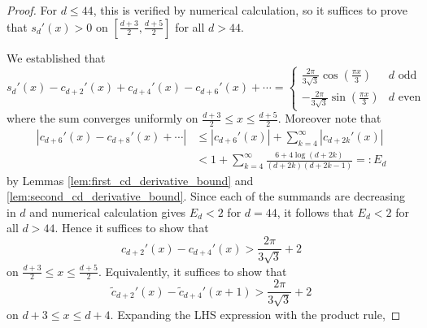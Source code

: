 \documentclass[10pt,a4paper]{amsart}
\begin{document}
 \begin{proof}
    For $d\leq 44$, this is verified by numerical calculation, so it suffices to prove that $s_d'(x) > 0 $ on $[\frac{d+3}{2},\frac{d+5}{2}]$ for all $d> 44$. 
    
    We established that
    $$ s_d'(x) - c_{d+2}'(x) + c_{d+4}'(x) - c_{d+6}'(x) + \cdots =  \begin{cases}
        \frac{2\pi}{3\sqrt{3}}\cos\left(\frac{\pi x}{3}\right) & d \text{ odd} \\
        -\frac{2\pi}{3\sqrt{3}}\sin\left(\frac{\pi x}{3}\right) & d \text{ even}
    \end{cases} $$
    where the sum converges uniformly on $\frac{d+3}{2}\leq x \leq \frac{d+5}{2}$. Moreover note that 
    \begin{align*}
        |c_{d+6}'(x)-c_{d+8}'(x)+\cdots|
         &\leq |c_{d+6}'(x)| + \sum_{k=4}^{\infty}|c_{d+2k}'(x)|\\
         &< 1 + \sum_{k=4}^{\infty}\frac{6+4\log(d+2k)}{(d+2k)(d+2k-1)} =: E_d	 
    \end{align*}
    by Lemmas \ref{lem:first_cd_derivative_bound} and \ref{lem:second_cd_derivative_bound}. Since each of the summands are decreasing in $d$ and numerical calculation gives $E_d<2$ for $d= 44$, it follows that $E_d<2$ for all $d> 44$. Hence it suffices to show that
    $$ c_{d+2}'(x) - c_{d+4}'(x) > \frac{2\pi}{3\sqrt{3}} + 2 $$
    on $\frac{d+3}{2}\leq x \leq \frac{d+5}{2}$. Equivalently, it suffices to show that $$ \tilde{c}_{d+2}'(x)-\tilde{c}_{d+4}'(x+1) > \frac{2\pi}{3\sqrt{3}} + 2 $$
    on $d+3\leq x\leq d+4$. Expanding the LHS expression with the product rule,
    

\end{proof}
\end{document}
